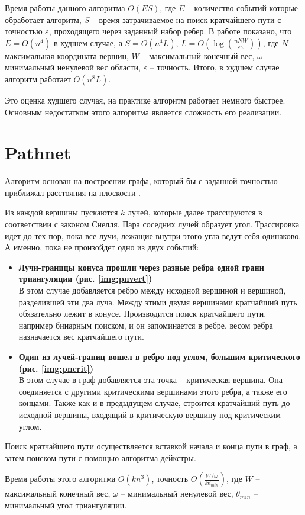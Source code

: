 Время работы данного алгоритма $O(ES)$, где $E$ -- количество событий
которые обработает алгоритм, $S$ -- время затрачиваемое на поиск
кратчайшего пути с точностью $\varepsilon$, проходящего через заданный
набор ребер. В работе \cite{CDIJ} показано, что $E = O(n^4)$
в худшем случае, а $S = O(n^4L)$, $L = O(\log(\frac{nNW}{\varepsilon \omega}))$,
где $N$ -- максимальная координата вершин, $W$ -- максимальный конечный вес,
$\omega$ -- минимальный ненулевой вес области, $\varepsilon$ -- точность.
Итого, в худшем случае алгоритм работает $O(n^8L)$.

Это оценка худшего случая, на практике алгоритм работает немного быстрее.
Основным недостатком этого алгоритма является сложность его реализации.

\FloatBarrier

\section{Pathnet}

Алгоритм основан на построении графа, который бы с заданной точностью приближал
расстояния на плоскости \cite{PATHNET}.

Из каждой вершины пускаются $k$ лучей, которые далее трассируются в соответствии
с законом Снелля. Пара соседних лучей образует угол. Трассировка идет до тех пор,
пока все лучи, лежащие внутри этого угла ведут себя одинаково. А именно, пока не
произойдет одно из двух событий:
\begin{itemize}
\item \textbf{Лучи-границы конуса прошли через разные
ребра одной грани триангуляции (рис. \ref{img:pnvert})}\\
В этом случае добавляется ребро между исходной вершиной и вершиной, разделившей
эти два луча. Между этими двумя вершинами кратчайший путь обязательно лежит в
конусе. Производится поиск кратчайшего пути, например бинарным поиском, и он
запоминается в ребре, весом ребра назначается вес кратчайшего пути.
\item \textbf{Один из лучей-границ вошел в ребро под углом,
большим критического (рис. \ref{img:pncrit})} \\
В этом случае в граф добавляется эта точка -- критическая вершина.
Она соединяется с другими критическими вершинами этого ребра, а также его концами.
Также как и в предыдущем случае, строится кратчайший путь до исходной вершины,
входящий в критическую вершину под критическим углом.
\end{itemize}


Поиск кратчайшего пути осуществляется вставкой начала и конца пути в граф, а затем
поиском пути с помощью алгоритма дейкстры.

Время работы этого алгоритма $O(kn^3)$, точность $O(\frac{W/\omega}{k\theta_{min}})$,
где $W$ -- максимальный конечный вес, $\omega$ -- минимальный ненулевой вес,
$\theta_{min}$ -- минимальный угол триангуляции.

\FloatBarrier
